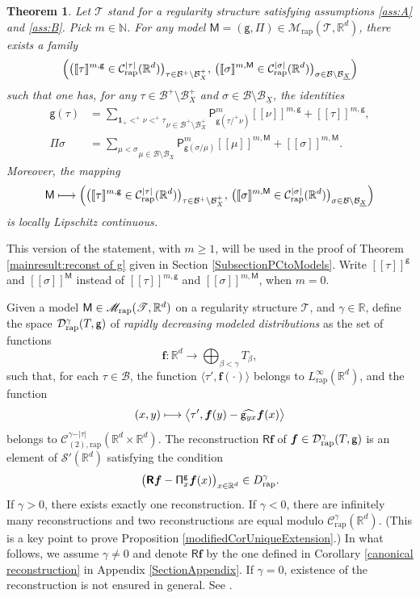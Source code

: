 \documentclass[10pt]{amsart}
\newcommand\mto{\mathchoice{\longmapsto}{\mapsto}{\mapsto}{\mapsto}}
\theoremstyle{plain}
\newtheorem{thm}{Theorem}
\theoremstyle{definition}
\newcommand{\unit}{\mathbf{1}}
\newcommand{\Brac}[1]{[\![#1]\!]}
\newcommand{\bsf}{\boldsymbol{f}}
\newcommand{\rap}{\mathrm{rap}}
\newcommand{\reR}{\boldsymbol{\mathsf{R}}}
\newcommand{\sfM}{\mathsf{M}}
\newcommand{\sfP}{\mathsf{P}}
\newcommand{\sfg}{\mathsf{g}}
\newcommand{\sfPi}{\mathsf{\Pi}}
\newcommand{\scrM}{\mathscr{M}}
\newcommand{\scrT}{\mathscr{T}}
\newcommand{\bbN}{\mathbb{N}}
\newcommand{\bbR}{\mathbb{R}}
\newcommand{\mcB}{\mathcal{B}}
\newcommand{\mcC}{\mathcal{C}}
\newcommand{\mcD}{\mathcal{D}}
\newcommand\mcS{\mathcal{S}}
\begin{document}
\begin{thm}\label{PropDefnBracket}
Let $\scrT$ stand for a regularity structure satisfying assumptions \eqref{ass:A} and \eqref{ass:B}. Pick $m\in\bbN$. For any model $\sfM=(\sfg,\sfPi)\in\scrM_\rap(\scrT,\bbR^d)$, there exists a family
\[
\Bigl(\bigl(\Brac{\tau}^{m,\sfg}\in \mcC^{\vert\tau\vert}_\rap(\bbR^d)\bigr)_{\tau\in\mcB^+\setminus\mcB_X^+}, \, \bigl(\Brac{\sigma}^{m,\sfM}\in \mcC^{\vert\sigma\vert}_\rap(\bbR^d)\bigr)_{\sigma\in\mcB\setminus \mcB_{\underline{X}}} \Bigr)
\]
such that one has, for any $\tau\in\mcB^+\setminus\mcB_X^+$ and $\sigma\in\mcB\setminus \mcB_{\underline{X}}$, the identities
\begin{align}
\label{def:bracket g}
\sfg(\tau) &= \underset{\nu\in\mcB^+\setminus\mcB_X^+}{\sum_{\unit_+<^+\nu<^+\tau}} \sfP^m_{\sfg(\tau/^+\nu)}\Brac{\nu}^{m,\sfg} + \Brac{\tau}^{m,\sfg}, \\
\label{def:bracket Pi}
\sfPi\sigma &= \underset{\mu\in\mcB\setminus \mcB_{\underline{X}}}{\sum_{\mu<\sigma}} \sfP^m_{\sfg(\sigma/\mu)}\Brac{\mu}^{m,\sfM} + \Brac{\sigma}^{m,\sfM}.
\end{align}
Moreover, the mapping
\[
\sfM \mto \Bigl(\bigl(\Brac{\tau}^{m,\sfg}\in \mcC^{\vert\tau\vert}_\rap(\bbR^d)\bigr)_{\tau\in\mcB^+\setminus\mcB_X^+}, \, \bigl(\Brac{\sigma}^{m,\sfM}\in \mcC^{\vert\sigma\vert}_\rap(\bbR^d)\bigr)_{\sigma\in\mcB\setminus \mcB_{\underline{X}}} \Bigr)
\]
is locally Lipschitz continuous.
\end{thm}

This version of the statement, with $m\geq 1$, will be used in the proof of Theorem \ref{mainresult:reconst of g} given in Section \ref{SubsectionPCtoModels}. Write $\Brac{\tau}^\sfg$ and $\Brac{\sigma}^\sfM$ instead of $\Brac{\tau}^{m,\sfg}$ and $\Brac{\sigma}^{m,\sfM}$, when $m=0$.

Given a model ${\sf M}\in\scrM_\rap(\scrT,\bbR^d)$ on a regularity structure $\scrT$, and $\gamma\in\bbR$, define the space $\mcD^\gamma_\rap(T,\sf g)$ of \emph{rapidly decreasing modeled distributions} as the set of functions
\[
{\bsf} : \bbR^d\to\bigoplus_{\beta<\gamma} T_\beta,
\]
such that, for each $\tau\in\mcB$, the function $\langle\tau',{\bsf}(\cdot)\rangle$ belongs to $L^\infty_\rap(\bbR^d)$, and the function
\[
(x,y) \mto \big\langle\tau',{\bsf}(y) - \widehat{{\sf g}_{yx}}\bsf(x)\big\rangle
\]
belongs to $\mcC^{\gamma-\vert\tau\vert}_{(2),\rap}(\bbR^d\times\bbR^d)$. The reconstruction $\reR\bsf$ of $\bsf\in\mcD_{\rap}^\gamma(T,{\sf g})$ is an element of $\mcS'(\bbR^d)$ satisfying the condition
\[
\bigl(\reR\bsf - {\sf \Pi}^{\sfg}_x\bsf(x)\bigr)_{x\in\bbR^d}\in D^\gamma_\rap.
\]
If $\gamma>0$, there exists exactly one reconstruction. If $\gamma<0$, there are infinitely many reconstructions and two reconstructions are equal modulo $\mcC_{\rap}^\gamma(\bbR^d)$. (This is a key point to prove Proposition \ref{modifiedCorUniqueExtension}.) In what follows, we assume $\gamma\neq0$ and denote $\reR\bsf$ by the one defined in Corollary \ref{canonical reconstruction} in Appendix \ref{SectionAppendix}. If $\gamma=0$, existence of the reconstruction is not ensured in general. See \cite[Ex.\,5.5]{CZ}.
\end{document}
